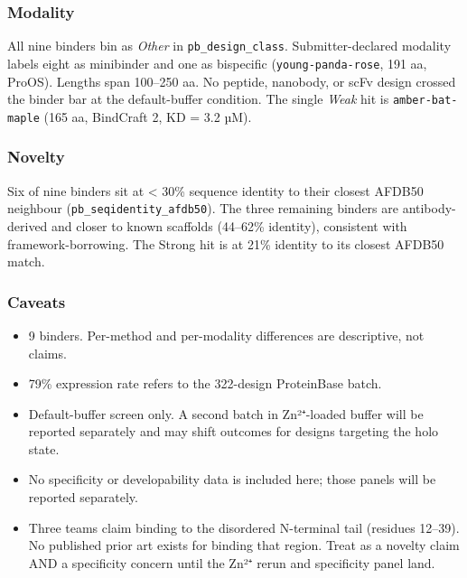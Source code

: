 \hypertarget{modality}{%
\subsubsection{Modality}\label{modality}}

All nine binders bin as \emph{Other} in \texttt{pb\_design\_class}.
Submitter-declared modality labels eight as minibinder and one as
bispecific (\texttt{young-panda-rose}, 191 aa, ProOS). Lengths span
100--250 aa. No peptide, nanobody, or scFv design crossed the binder
bar at the default-buffer condition. The single \emph{Weak} hit is
\texttt{amber-bat-maple} (165 aa, BindCraft 2, KD = 3.2 µM).

\hypertarget{novelty}{%
\subsubsection{Novelty}\label{novelty}}

Six of nine binders sit at \textless{} 30\% sequence identity to their
closest AFDB50 neighbour (\texttt{pb\_seqidentity\_afdb50}). The three
remaining binders are antibody-derived and closer to known scaffolds
(44--62\% identity), consistent with framework-borrowing. The Strong
hit is at 21\% identity to its closest AFDB50 match.

\hypertarget{caveats}{%
\subsubsection{Caveats}\label{caveats}}

\begin{itemize}
\tightlist
\item
  9 binders. Per-method and per-modality differences are descriptive,
  not claims.
\item
  79\% expression rate refers to the 322-design ProteinBase batch.
\item
  Default-buffer screen only. A second batch in Zn²⁺-loaded buffer
  will be reported separately and may shift outcomes for designs
  targeting the holo state.
\item
  No specificity or developability data is included here; those panels
  will be reported separately.
\item
  Three teams claim binding to the disordered N-terminal tail
  (residues 12--39). No published prior art exists for binding that
  region. Treat as a novelty claim AND a specificity concern until the
  Zn²⁺ rerun and specificity panel land.
\end{itemize}
